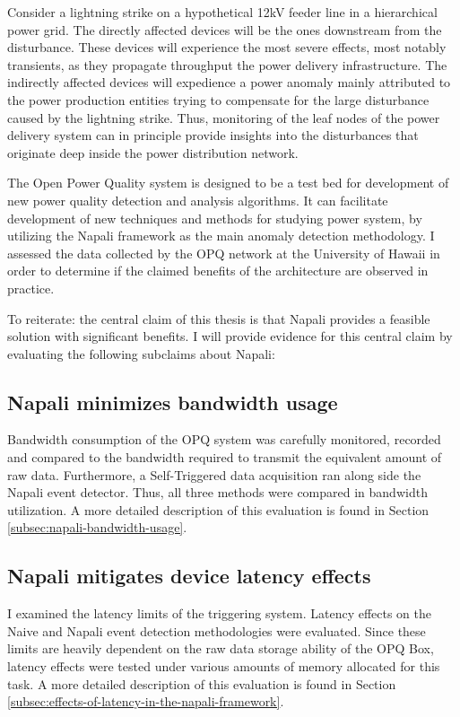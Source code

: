 Consider a lightning strike on a hypothetical 12kV feeder line in a hierarchical power grid.
The directly affected devices will be the ones downstream from the disturbance.
These devices will experience the most severe effects, most notably transients, as they propagate throughput the power delivery infrastructure.
The indirectly affected devices will expedience a power anomaly mainly attributed to the power production entities trying to compensate for the large disturbance caused by the lightning strike.
Thus, monitoring of the leaf nodes of the power delivery system can in principle provide insights into the disturbances that originate deep inside the power distribution network.

The Open Power Quality system is designed to be a test bed for development of new power quality detection and analysis algorithms.
It can facilitate development of new techniques and methods for studying power system, by utilizing the Napali framework as the main anomaly detection methodology.
I assessed the data collected by the OPQ network at the University of Hawaii in order to determine if the claimed benefits of the architecture are observed in practice.


To reiterate: the central claim of this thesis is that Napali provides a feasible solution with significant benefits.
I will provide evidence for this central claim by evaluating the following subclaims about Napali:

\subsection{Napali minimizes bandwidth usage}\label{subsec:napali-minimizes-bandwidth-useage}
Bandwidth consumption of the OPQ system was carefully monitored, recorded and compared to the bandwidth required to transmit the equivalent amount of raw data.
Furthermore, a Self-Triggered data acquisition ran along side the Napali event detector.
Thus, all three methods were compared in bandwidth utilization.
A more detailed description of this evaluation is found in Section \ref{subsec:napali-bandwidth-usage}.

\subsection{Napali mitigates device latency effects}\label{subsec:effects-of-latency-are-minimized:}
I examined the latency limits of the triggering system.
Latency effects on the Naive and Napali event detection methodologies were evaluated.
Since these limits are heavily dependent on the raw data storage ability of the OPQ Box, latency effects were tested under various amounts of memory allocated for this task.
A more detailed description of this evaluation is found in Section \ref{subsec:effects-of-latency-in-the-napali-framework}.

